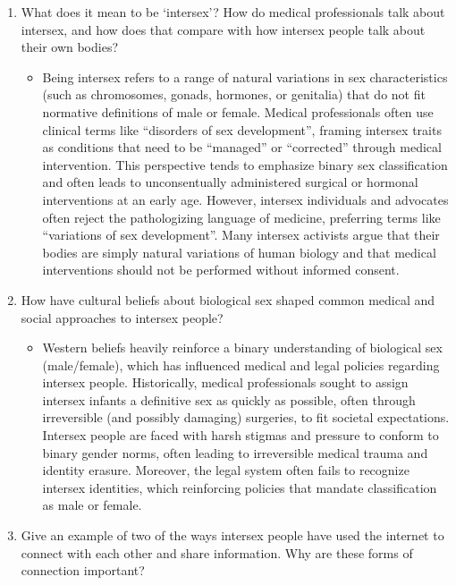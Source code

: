 \documentclass{article}
\begin{document}
\begin{enumerate}
  \item What does it mean to be `intersex'? How do medical professionals talk about intersex, and how does that compare with how intersex people talk about their own bodies? \begin{itemize}
    \item Being intersex refers to a range of natural variations in sex characteristics (such as chromosomes, gonads, hormones, or genitalia) that do not fit normative definitions of male or female. Medical professionals often use clinical terms like ``disorders of sex development'', framing intersex traits as conditions that need to be ``managed'' or ``corrected'' through medical intervention. This perspective tends to emphasize binary sex classification and often leads to unconsentually administered surgical or hormonal interventions at an early age. However, intersex individuals and advocates often reject the pathologizing language of medicine, preferring terms like ``variations of sex development''. Many intersex activists argue that their bodies are simply natural variations of human biology and that medical interventions should not be performed without informed consent.
  \end{itemize}
  \item How have cultural beliefs about biological sex shaped common medical and social approaches to intersex people? \begin{itemize}
  \item Western beliefs heavily reinforce a binary understanding of biological sex (male/female), which has influenced medical and legal policies regarding intersex people. Historically, medical professionals sought to assign intersex infants a definitive sex as quickly as possible, often through irreversible (and possibly damaging) surgeries, to fit societal expectations. Intersex people are faced with harsh stigmas and pressure to conform to binary gender norms, often leading to irreversible medical trauma and identity erasure. Moreover, the legal system often fails to recognize intersex identities, which reinforcing policies that mandate classification as male or female.
\end{itemize}
  \item Give an example of two of the ways intersex people have used the internet to connect with each other and share information. Why are these forms of connection important? \begin{itemize}

\end{itemize}
\end{enumerate}
\end{document}
